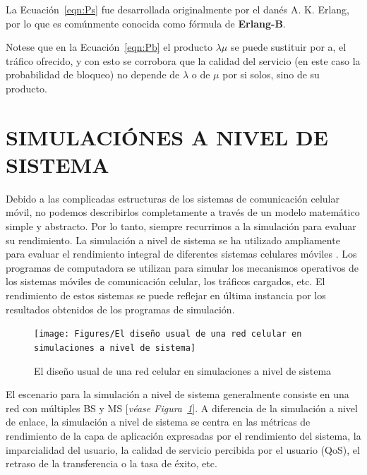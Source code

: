 La Ecuación~\ref{eqn:Ps} fue desarrollada originalmente por el danés A. K. Erlang, por lo que es comúnmente conocida como fórmula de \textbf{Erlang-B}.\newline

Notese que en la Ecuación~\ref{eqn:Pb} el producto $\lambda \mu$ se puede sustituir por a, el tráfico ofrecido, y con esto se corrobora que la calidad del servicio (en este caso la probabilidad de bloqueo) no depende de $\lambda$ o de $\mu$ por si solos, sino de su producto.\newline


\section{SIMULACIÓNES A NIVEL DE SISTEMA}

Debido a las complicadas estructuras de los sistemas de comunicación celular móvil, no podemos describirlos completamente a través de un modelo matemático simple y abstracto. Por lo tanto, siempre recurrimos a la simulación para evaluar su rendimiento. La simulación a nivel de sistema se ha utilizado ampliamente para evaluar el rendimiento integral de diferentes sistemas celulares móviles \parencite{Chen2011}. Los programas de computadora se utilizan para simular los mecanismos operativos de los sistemas móviles de comunicación celular, los tráficos cargados, etc. El rendimiento de estos sistemas se puede reflejar en última instancia por los resultados obtenidos de los programas de simulación.\newline

\begin{figure}[th]
\centering
\texttt{[image: Figures/El diseño usual de una red celular en simulaciones a nivel de sistema]}
\decoRule
\caption[El diseño usual de una red celular en simulaciones a nivel de sistema]{El diseño usual de una red celular en simulaciones a nivel de sistema}
\label{fig:sim_sistema}
\end{figure}

El escenario para la simulación a nivel de sistema generalmente consiste en una red con múltiples BS y MS [\textit{véase Figura~\ref{fig:sim_sistema}}]. A diferencia de la simulación a nivel de enlace, la simulación a nivel de sistema se centra en las métricas de rendimiento de la capa de aplicación expresadas por el rendimiento del sistema, la imparcialidad del usuario, la calidad de servicio percibida por el usuario (QoS), el retraso de la transferencia o la tasa de éxito, etc.

